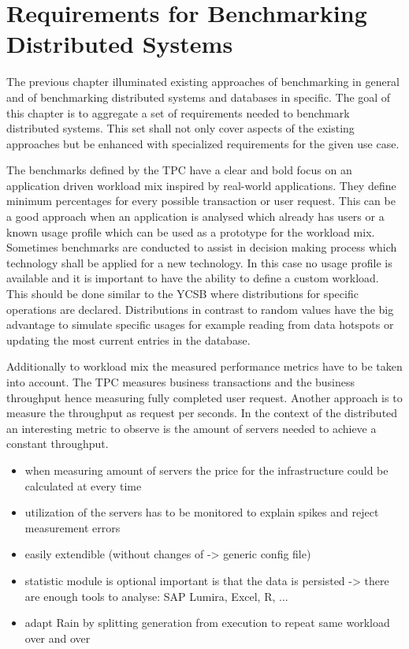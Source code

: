 
\chapter{Requirements for Benchmarking Distributed Systems}
\label{cha:requirements}
The previous chapter illuminated existing approaches of benchmarking in general and of benchmarking distributed systems and databases in specific. The goal of this chapter is to aggregate a set of requirements needed to benchmark distributed systems. This set shall not only cover aspects of the existing approaches but be enhanced with specialized requirements for the given use case.

The benchmarks defined by the \ac{TPC} have a clear and bold focus on an application driven workload mix inspired by real-world applications. They define minimum percentages for every possible transaction or user request. This can be a good approach when an application is analysed which already has users or a known usage profile which can be used as a prototype for the workload mix. Sometimes benchmarks are conducted to assist in decision making process which technology shall be applied for a new technology. In this case no usage profile is available and it is important to have the ability to define a custom workload. This should be done similar to the YCSB where distributions for specific operations are declared. Distributions in contrast to random values have the big advantage to simulate specific usages for example reading from data hotspots or updating the most current entries in the database.

Additionally to workload mix the measured performance metrics have to be taken into account. The \ac{TPC} measures business transactions and the business throughput hence measuring fully completed user request. Another approach is to measure the throughput as request per seconds. In the context of the distributed an interesting metric to observe is the amount of servers needed to achieve a constant throughput.

\begin{itemize}
  \item when measuring amount of servers the price for the infrastructure could be calculated at every time
  \item utilization of the servers has to be monitored to explain spikes and reject measurement errors
  \item easily extendible (without changes of -> generic config file)
  \item statistic module is optional important is that the data is persisted -> there are enough tools to analyse: SAP Lumira, Excel, R, ...
  \item adapt Rain by splitting generation from execution to repeat same workload over and over
\end{itemize}
